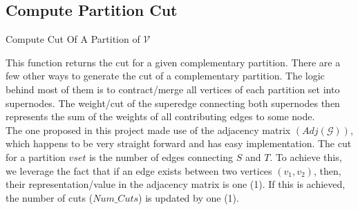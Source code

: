 \documentclass[longpaper, english, final, times]{revdetua}
\begin{document}
			\subsection{Compute Partition Cut}
				\begin{algorithm}
					\caption{Compute Cut Of A Partition of $\mathcal{V}$}
					\label{algotithm:GetPartCut}
					
					\DontPrintSemicolon
					
					
					
				\end{algorithm}
				
				This function returns the cut for a given complementary partition. There are a few other ways to generate the cut of a complementary partition. The logic behind most of them is to contract/merge all vertices of each partition set into supernodes. The weight/cut of the superedge connecting both supernodes then represents the sum of the weights of all contributing edges to some node.\\
				
				The one proposed in this project made use of the adjacency matrix $(Adj(\mathcal{G}))$, which happens to be very straight forward and has easy implementation. The cut for a partition $vset$ is the number of edges connecting $S$ and $T$. To achieve this, we leverage the fact that if an edge exists between two vertices $(v_1, v_2)$, then, their representation/value in the adjacency matrix is one (1). If this is achieved, the number of cuts ($Num\_Cuts$) is updated by one (1).\\
				
\end{document}
